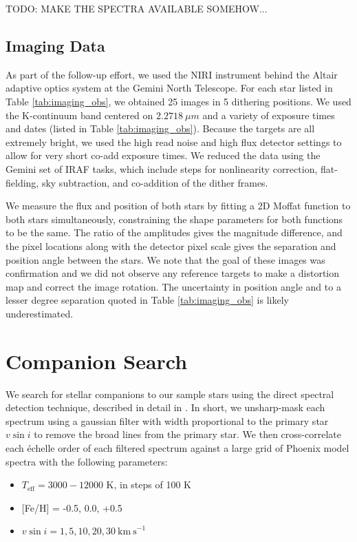 \documentclass{emulateapj}
\begin{document}
TODO: MAKE THE SPECTRA AVAILABLE SOMEHOW...


\subsection{Imaging Data}
As part of the follow-up effort, we used the NIRI instrument behind the Altair adaptive optics system at the Gemini North Telescope. For each star listed in Table \ref{tab:imaging_obs}, we obtained 25 images in 5 dithering positions. We used the K-continuum band centered on $2.2718\ \mu m$ and a variety of exposure times and dates (listed in Table \ref{tab:imaging_obs}). Because the targets are all extremely bright, we used the high read noise and high flux detector settings to allow for very short co-add exposure times. We reduced the data using the Gemini set of IRAF tasks, which include steps for nonlinearity correction, flat-fielding, sky subtraction, and co-addition of the dither frames. 

We measure the flux and position of both stars by fitting a 2D Moffat function \citep{Moffat1969} to both stars simultaneously, constraining the shape parameters for both functions to be the same. The ratio of the amplitudes gives the magnitude difference, and the pixel locations along with the detector pixel scale gives the separation and position angle between the stars. We note that the goal of these images was confirmation and we did not observe any reference targets to make a distortion map and correct the image rotation. The uncertainty in position angle and to a lesser degree separation quoted in Table \ref{tab:imaging_obs} is likely underestimated.





\section{Companion Search}
\label{sec:companions}

We search for stellar companions to our sample stars using the direct spectral detection technique, described in detail in \citet{Gullikson2016}. In short, we unsharp-mask each spectrum using a gaussian filter with width proportional to the primary star $v\sin{i}$ to remove the broad lines from the primary star. We then cross-correlate each \'echelle order of each filtered spectrum against a large grid of Phoenix model spectra \citep{Husser2013_b} with the following parameters:

\begin{itemize}
\item $T_\mathrm{eff} = 3000-12000$ K, in steps of 100 K
\item {[}Fe/H{]} = -0.5, 0.0, +0.5
\item $v\sin{i} = 1, 5, 10, 20, 30 \ \mathrm{km\ s}^{-1}$
\end{itemize}
\end{document}
